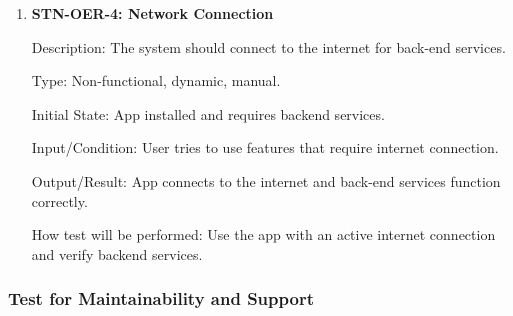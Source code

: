 \documentclass[12pt, titlepage]{article}
\begin{document}
\begin{enumerate}
        \item{\textbf{STN-OER-4: Network Connection}}

        Description: The system should connect to the internet for back-end services.

        Type: Non-functional, dynamic, manual.

        Initial State: App installed and requires backend services.

        Input/Condition: User tries to use features that require internet
        connection.

        Output/Result: App connects to the internet and back-end services function correctly.

        How test will be performed: Use the app with an active internet connection and verify backend services.

    \end{enumerate}


    \subsubsection{Test for Maintainability and Support}
\end{document}
